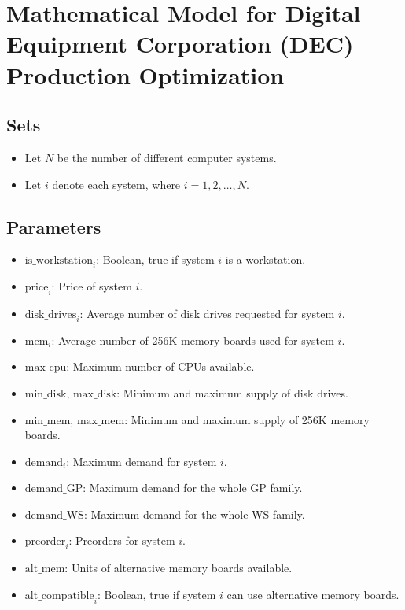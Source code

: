 \documentclass{article}
\begin{document}
\section*{Mathematical Model for Digital Equipment Corporation (DEC) Production Optimization}

\subsection*{Sets}
\begin{itemize}
    \item Let \( N \) be the number of different computer systems.
    \item Let \( i \) denote each system, where \( i = 1, 2, \ldots, N \).
\end{itemize}

\subsection*{Parameters}
\begin{itemize}
    \item \( \text{is\_workstation}_i \): Boolean, true if system \( i \) is a workstation.
    \item \( \text{price}_i \): Price of system \( i \).
    \item \( \text{disk\_drives}_i \): Average number of disk drives requested for system \( i \).
    \item \( \text{mem}_i \): Average number of 256K memory boards used for system \( i \).
    \item \( \text{max\_cpu} \): Maximum number of CPUs available.
    \item \( \text{min\_disk} \), \( \text{max\_disk} \): Minimum and maximum supply of disk drives.
    \item \( \text{min\_mem} \), \( \text{max\_mem} \): Minimum and maximum supply of 256K memory boards.
    \item \( \text{demand}_i \): Maximum demand for system \( i \).
    \item \( \text{demand\_GP} \): Maximum demand for the whole GP family.
    \item \( \text{demand\_WS} \): Maximum demand for the whole WS family.
    \item \( \text{preorder}_i \): Preorders for system \( i \).
    \item \( \text{alt\_mem} \): Units of alternative memory boards available.
    \item \( \text{alt\_compatible}_i \): Boolean, true if system \( i \) can use alternative memory boards.
\end{itemize}
\end{document}
